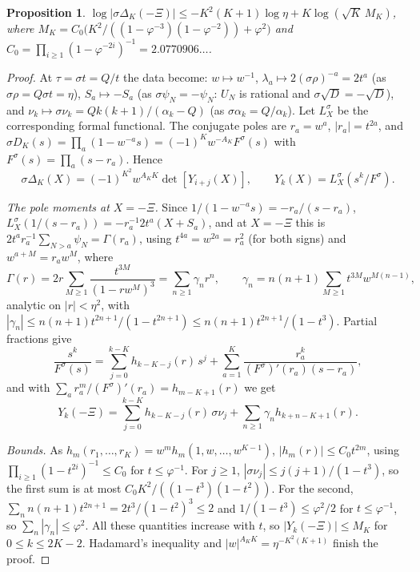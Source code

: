 \documentclass[11pt]{amsart}
\newtheorem{proposition}[theorem]{Proposition}
\theoremstyle{definition}
\theoremstyle{remark}
\numberwithin{equation}{section}
\begin{document}
\begin{proposition}\label{prop:conj}
$\log|\sigma\Delta_K(-\Xi)|\le-K^2(K+1)\log\eta+K\log(\sqrt K\,M_K)$, where
$M_K=C_0\bigl(K^2/((1-\varphi^{-3})(1-\varphi^{-2}))+\varphi^2\bigr)$ and
$C_0=\prod_{i\ge1}(1-\varphi^{-2i})^{-1}=2.0770906\ldots$.
\end{proposition}
\begin{proof}
At $\tau=\sigma t=Q/t$ the data become: $w\mapsto w^{-1}$, $\lambda_a\mapsto2(\sigma\rho)^{-a}=2t^a$ (as
$\sigma\rho=Q\sigma t=\eta$), $S_a\mapsto-S_a$ (as $\sigma\psi_N=-\psi_N$: $U_N$ is rational and $\sigma\sqrt D=-\sqrt D$),
and $\nu_k\mapsto\sigma\nu_k=Qk(k+1)/(\alpha_k-Q)$ (as $\sigma\alpha_k=Q/\alpha_k$). Let $L^\sigma_X$ be the
corresponding formal functional. The conjugate poles are $r_a=w^a$, $|r_a|=t^{2a}$, and
$\sigma D_K(s)=\prod_a(1-w^{-a}s)=(-1)^Kw^{-A_K}F^\sigma(s)$ with $F^\sigma(s)=\prod_a(s-r_a)$. Hence
\[
\sigma\Delta_K(X)=(-1)^{K^2}w^{A_KK}\det[Y_{i+j}(X)],\qquad Y_k(X)=L^\sigma_X(s^k/F^\sigma).
\]

\emph{The pole moments at $X=-\Xi$.} Since $1/(1-w^{-a}s)=-r_a/(s-r_a)$, $L^\sigma_X(1/(s-r_a))=-r_a^{-1}2t^a(X+S_a)$,
and at $X=-\Xi$ this is $2t^ar_a^{-1}\sum_{N>a}\psi_N=\Gamma(r_a)$, using $t^{4a}=w^{2a}=r_a^2$ (for both signs) and
$w^{a+M}=r_aw^M$, where
\[
\Gamma(r)=2r\sum_{M\ge1}\frac{t^{3M}}{(1-rw^M)^3}=\sum_{n\ge1}\gamma_nr^n,\qquad
\gamma_n=n(n+1)\sum_{M\ge1}t^{3M}w^{M(n-1)},
\]
analytic on $|r|<\eta^2$, with $|\gamma_n|\le n(n+1)t^{2n+1}/(1-t^{2n+1})\le n(n+1)t^{2n+1}/(1-t^3)$. Partial fractions
give
\[
\frac{s^k}{F^\sigma(s)}=\sum_{j=0}^{k-K}h_{k-K-j}(r)\,s^j+\sum_{a=1}^K\frac{r_a^k}{(F^\sigma)'(r_a)(s-r_a)},
\]
and with $\sum_ar_a^m/(F^\sigma)'(r_a)=h_{m-K+1}(r)$ we get
\[
Y_k(-\Xi)=\sum_{j=0}^{k-K}h_{k-K-j}(r)\,\sigma\nu_j+\sum_{n\ge1}\gamma_nh_{k+n-K+1}(r).
\]

\emph{Bounds.} As $h_m(r_1,\dots,r_K)=w^mh_m(1,w,\dots,w^{K-1})$, $|h_m(r)|\le C_0t^{2m}$, using
$\prod_{i\ge1}(1-t^{2i})^{-1}\le C_0$ for $t\le\varphi^{-1}$. For $j\ge1$, $|\sigma\nu_j|\le j(j+1)/(1-t^3)$, so the first
sum is at most $C_0K^2/((1-t^3)(1-t^2))$. For the second,
$\sum_nn(n+1)t^{2n+1}=2t^3/(1-t^2)^3\le2$ and $1/(1-t^3)\le\varphi^2/2$ for $t\le\varphi^{-1}$, so
$\sum_n|\gamma_n|\le\varphi^2$. All these quantities increase with $t$, so $|Y_k(-\Xi)|\le M_K$ for $0\le k\le2K-2$.
Hadamard's inequality and $|w|^{A_KK}=\eta^{-K^2(K+1)}$ finish the proof.
\end{proof}

\end{document}
